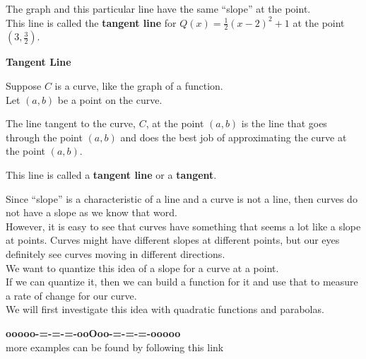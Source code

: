 \documentclass{ximera}
\begin{document}
The graph and this particular line have the same ``slope'' at the point. \\


This line is called the \textbf{\textcolor{blue!55!black}{tangent line}} for $Q(x) = \frac{1}{2} (x - 2)^2 + 1$ at the point $\left( 3, \frac{3}{2} \right)$.




\begin{definition} \textbf{\textcolor{green!50!black}{Tangent Line}}


Suppose $C$ is a curve, like the graph of a function. \\

Let $(a, b)$ be a point on the curve.

The line tangent to the curve, $C$, at the point $(a, b)$ is the line that goes through the point $(a, b)$ and does the best job of approximating the curve at the point $(a, b)$.

This line is called a \textbf{tangent line} or a \textbf{tangent}.


\end{definition}


Since ``slope'' is a characteristic of a line and a curve is not a line, then curves do not have a slope as we know that word. \\

However, it is easy to see that curves have something that seems a lot like a slope at points. Curves might have different slopes at different points, but our eyes definitely see curves moving in different directions.\\

We want to quantize this idea of a slope for a curve at a point. \\

If we can quantize it, then we can build a function for it and use that to measure a rate of change for our curve. \\

We will first investigate this idea with quadratic functions and parabolas.






















\begin{center}
\textbf{\textcolor{green!50!black}{ooooo-=-=-=-ooOoo-=-=-=-ooooo}} \\

more examples can be found by following this link\\ 

\end{center}
\end{document}

